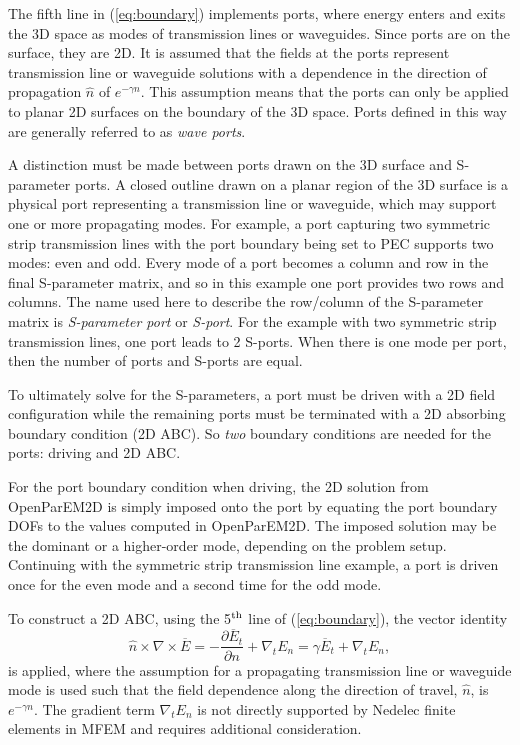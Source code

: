 \documentclass[titlepage]{article}
\renewcommand\_{\textunderscore\linebreak[1]}
\begin{document}
The fifth line in (\ref{eq:boundary}) implements ports, where energy enters and exits the 3D space as modes of transmission lines or waveguides.  Since ports are on the surface, they are 2D.  It is assumed that the fields at the ports represent transmission line or waveguide solutions with a dependence in the direction of propagation $\hat{n}$ of $e^{-\gamma n}$.  This assumption means that the ports can only be applied to planar 2D surfaces on the boundary of the 3D space.  Ports defined in this way are generally referred to as \textit{wave ports}.

A distinction must be made between ports drawn on the 3D surface and S-parameter ports.  A closed outline drawn on a planar region of the 3D surface is a physical port representing a transmission line or waveguide, which may support one or more propagating modes.  For example, a port capturing two symmetric strip transmission lines with the port boundary being set to PEC supports two modes: even and odd.  Every mode of a port becomes a column and row in the final S-parameter matrix, and so in this example one port provides two rows and columns.  The name used here to describe the row/column of the S-parameter matrix is \textit{S-parameter port} or \textit{S-port}.  For the example with two symmetric strip transmission lines, one port leads to 2 S-ports.  When there is one mode per port, then the number of ports and S-ports are equal.

To ultimately solve for the S-parameters, a port must be driven with a 2D field configuration while the remaining ports must be terminated with a 2D absorbing boundary condition (2D ABC).  So  \textit{two} boundary conditions are needed for the ports: driving and 2D ABC.

For the port boundary condition when driving, the 2D solution from OpenParEM2D is simply imposed onto the port by equating the port boundary DOFs to the values computed in OpenParEM2D.  The imposed solution may be the dominant or a higher-order mode, depending on the problem setup.  Continuing with the symmetric strip transmission line example, a port is driven once for the even mode and a second time for the odd mode.

To construct a 2D ABC, using the 5$^{\textnormal{th}}$ line of (\ref{eq:boundary}), the vector identity
\begin{equation}
\label{eq:fifth_term}
\hat{n}\times\nabla\times\overline{E}=-\frac{\partial\overline{E}_t}{\partial{n}}+\nabla_t E_n=\gamma \overline{E}_t + \nabla_t E_n,
\end{equation}
is applied, where the assumption for a propagating transmission line or waveguide mode is used such that the field dependence along the direction of travel, $\hat{n}$, is $e^{-\gamma n}$. The gradient term $\nabla_t E_n$ is not directly supported by Nedelec finite elements in MFEM and requires additional consideration.
\end{document}
